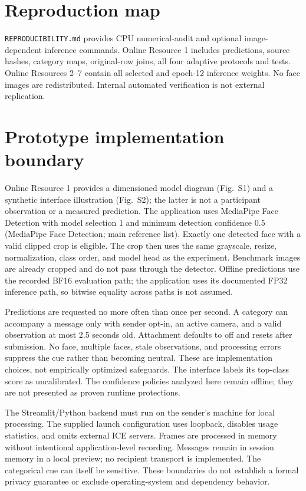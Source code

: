 \documentclass[10pt]{article}
\begin{document}
\section*{Reproduction map}
\texttt{REPRODUCIBILITY.md} provides CPU numerical-audit and optional image-dependent inference commands. Online Resource 1 includes predictions, source hashes, category maps, original-row joins, all four adaptive protocols and tests. Online Resources 2--7 contain all selected and epoch-12 inference weights. No face images are redistributed. Internal automated verification is not external replication.
\clearpage
\section*{Prototype implementation boundary}

Online Resource 1 provides a dimensioned model diagram (Fig.~S1) and a synthetic interface illustration (Fig.~S2); the latter is not a participant observation or a measured prediction.
The application uses MediaPipe Face Detection with model selection 1 and minimum detection confidence 0.5 (MediaPipe Face Detection; main reference list). Exactly one detected face with a valid clipped crop is eligible. The crop then uses the same grayscale, resize, normalization, class order, and model head as the experiment. Benchmark images are already cropped and do not pass through the detector. Offline predictions use the recorded BF16 evaluation path; the application uses its documented FP32 inference path, so bitwise equality across paths is not assumed.

Predictions are requested no more often than once per second. A category can accompany a message only with sender opt-in, an active camera, and a valid observation at most 2.5 seconds old. Attachment defaults to off and resets after submission. No face, multiple faces, stale observations, and processing errors suppress the cue rather than becoming neutral. These are implementation choices, not empirically optimized safeguards. The interface labels its top-class score as uncalibrated. The confidence policies analyzed here remain offline; they are not presented as proven runtime protections.

The Streamlit/Python backend must run on the sender's machine for local processing. The supplied launch configuration uses loopback, disables usage statistics, and omits external ICE servers. Frames are processed in memory without intentional application-level recording. Messages remain in session memory in a local preview; no recipient transport is implemented. The categorical cue can itself be sensitive. These boundaries do not establish a formal privacy guarantee or exclude operating-system and dependency behavior.
\end{document}
